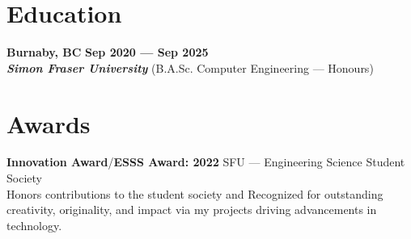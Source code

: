 \documentclass[letterpaper,11pt]{article}
\newcommand{\school} [5] {
    {\textbf{#3} \hfill \textbf{#4 --- #5}\\ \textbf{\emph{#1}} (#2)\\}
}
\begin{document}
    \section{Education}
    \school{Simon Fraser University}{B.A.Sc. Computer Engineering --- Honours}{Burnaby, BC}{Sep 2020}{Sep 2025}

    \section{Awards}
    \textbf{Innovation Award}/\textbf{ESSS Award: 2022} \hfill SFU --- Engineering Science Student Society\\
    Honors contributions to the student society and Recognized for outstanding creativity, originality, and impact via my projects driving advancements in technology.\\
\end{document}
